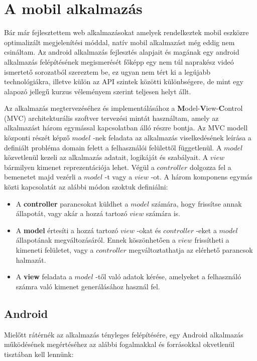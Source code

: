\documentclass[12pt]{report}
\theoremstyle{definition}
\begin{document}
	
	\chapter{A mobil alkalmazás}
	Bár már fejlesztettem web alkalmazásokat amelyek rendelkeztek mobil eszközre optimalizált megjelenítési móddal, natív mobil alkalmazást még eddig nem csináltam. Az android alkalmazás fejlesztés alapjait és magának egy android alkalmazás felépítésének megismerését főképp egy nem túl naprakész videó ismertető sorozatból szereztem be, ez ugyan nem tért ki a legújabb technológiákra, illetve külön az API szintek közötti különbségere, de mint egy alapozó jellegű kurzus véleményem szerint teljesen helyt állt.
	
	Az alkalmazás megtervezéséhez és implementálásához a \textbf{M}odel-\textbf{V}iew-\textbf{C}ontrol (MVC) architekturális szoftver tervezési mintát használtam, amely az alkalmazást három egymással kapcsolatban álló részre bontja. Az MVC modell központi részét képző $model$ -nek feladata az alkalmazás viselkedésének leírása a definiált probléma domain felett a felhasználói felülettől függetlenül. A $model$ közvetlenül kezeli az alkalmazás adatait, logikáját és szabályait. A $view$ bármilyen kimenet reprezentációja lehet. Végül a $controller$ dolgozza fel a bemenetet majd vezérli a $model$ -t vagy a $view$ -ot. A három komponens egymás közti kapcsolatát az alábbi módon szoktuk definiálni:
	
	\begin{itemize}
		\item A \textbf{controller} parancsokat küldhet a $model$ számára, hogy frissítse annak állapotát, vagy akár a hozzá tartozó $view$ számára is.
		\item A \textbf{model} értesíti a hozzá tartozó $view$ -okat és $controller$ -eket a $model$ állapotának megváltozásáról. Ennek köszönhetően a $view$ frissítheti a kimeneti felületet, vagy a $controller$ megváltoztathatja az elérhető parancsok halmazát.
		\item A \textbf{view} feladata a $model$ -től való adatok kérése, amelyeket a felhasználó számra való kimenet generálásához használ fel.
	\end{itemize}
	
	\section{Android}
	Mielőtt rátérnék az alkalmazás tényleges felépítésére, egy Android alkalmazás működésének megértéséhez az alábbi fogalmakkal és forrásokkal okvetlenül tisztában kell lennünk:
	
\end{document}
